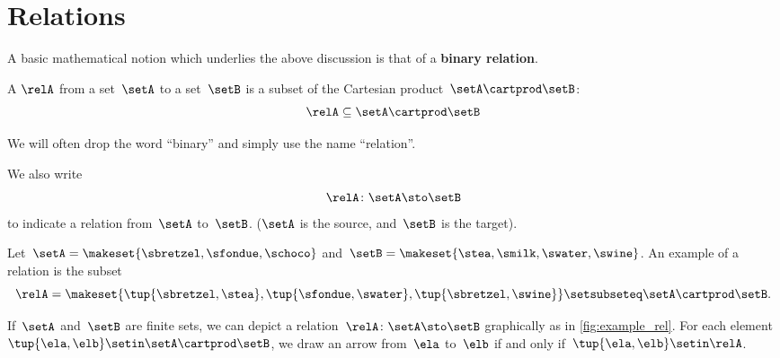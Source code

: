 
\section{Relations}
\label{sec:connection-relations}

A basic mathematical notion which underlies the above discussion is that of a \textbf{binary relation}.

\begin{ctdefinition}
    \label{def:binary-relation}
    A \emph{} $\relA$ from a set~$\setA$ to a set~$\setB$ is a subset of the Cartesian product~$\setA\cartprod \setB$:
    \begin{equation}
        \relA \subseteq \setA \cartprod \setB
    \end{equation}
\end{ctdefinition}

We will often drop the word ``binary'' and simply use the name ``relation''.

We also write
\begin{equation}
    \relA \colon \setA \sto \setB
\end{equation}
to indicate a relation from~$\setA$ to~$\setB$.
($\setA$ is the source, and~$\setB$ is the target).

\begin{marginfigure}
    \centering
    \caption{}
    \label{fig:example_rel}
\end{marginfigure}

\begin{example}
    \label{exa:simple-rel}
    Let~$\setA = \makeset{ \sbretzel, \sfondue, \schoco}$ and~$\setB = \makeset{ \stea, \smilk, \swater, \swine }$.
    An example of a relation is the subset
    \begin{equation}
        \relA = \makeset{ \tup{\sbretzel, \stea}, \tup{\sfondue, \swater}, \tup{\sbretzel, \swine} } \setsubseteq \setA \cartprod \setB.
    \end{equation}
\end{example}

If~$\setA$ and~$\setB$ are finite sets, we can depict a relation~$\relA \colon \setA \sto \setB$ graphically as in \cref{fig:example_rel}.
For each element~$\tup{\ela,\elb} \setin \setA \cartprod \setB$, we draw an arrow from~$\ela$ to~$\elb$ if and only if~$\tup{\ela,\elb} \setin \relA$.

